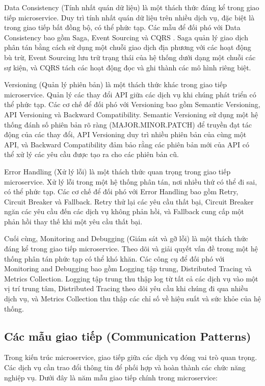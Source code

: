 Data Consistency (Tính nhất quán dữ liệu) là một thách thức đáng kể trong giao
tiếp microservice. Duy trì tính nhất quán dữ liệu trên nhiều dịch vụ, đặc biệt
là trong giao tiếp bất đồng bộ, có thể phức tạp. Các mẫu để đối phó với Data
Consistency bao gồm Saga, Event Sourcing và CQRS \cite{richardson2019}. Saga quản lý giao dịch phân
tán bằng cách sử dụng một chuỗi giao dịch địa phương với các hoạt động bù trừ,
Event Sourcing lưu trữ trạng thái của hệ thống dưới dạng một chuỗi các sự kiện,
và CQRS tách các hoạt động đọc và ghi thành các mô hình riêng biệt.

Versioning (Quản lý phiên bản) là một thách thức khác trong giao tiếp
microservice. Quản lý các thay đổi API giữa các dịch vụ khi chúng phát triển có
thể phức tạp. Các cơ chế để đối phó với Versioning bao gồm Semantic Versioning,
API Versioning và Backward Compatibility. Semantic Versioning sử dụng một hệ
thống đánh số phiên bản rõ ràng (MAJOR.MINOR.PATCH) để truyền đạt tác động của
các thay đổi, API Versioning duy trì nhiều phiên bản của cùng một API, và
Backward Compatibility đảm bảo rằng các phiên bản mới của API có thể xử lý các
yêu cầu được tạo ra cho các phiên bản cũ.

Error Handling (Xử lý lỗi) là một thách thức quan trọng trong giao tiếp
microservice. Xử lý lỗi trong một hệ thống phân tán, nơi nhiều thứ có thể đi
sai, có thể phức tạp. Các cơ chế để đối phó với Error Handling bao gồm Retry,
Circuit Breaker và Fallback. Retry thử lại các yêu cầu thất bại, Circuit
Breaker ngăn các yêu cầu đến các dịch vụ không phản hồi, và Fallback cung cấp
một phản hồi thay thế khi một yêu cầu thất bại.

Cuối cùng, Monitoring and Debugging (Giám sát và gỡ lỗi) là một thách thức đáng
kể trong giao tiếp microservice. Theo dõi và giải quyết vấn đề trong một hệ
thống phân tán phức tạp có thể khó khăn. Các công cụ để đối phó với Monitoring
and Debugging bao gồm Logging tập trung, Distributed Tracing và Metrics
Collection. Logging tập trung thu thập log từ tất cả các dịch vụ vào một vị trí
trung tâm, Distributed Tracing theo dõi yêu cầu khi chúng đi qua nhiều dịch vụ,
và Metrics Collection thu thập các chỉ số về hiệu suất và sức khỏe của hệ
thống.

\subsection{Các mẫu giao tiếp (Communication Patterns)}
Trong kiến trúc microservice, giao tiếp giữa các dịch vụ đóng vai trò quan trọng. Các dịch vụ cần trao đổi thông tin để phối hợp và hoàn thành các chức năng nghiệp vụ. Dưới đây là năm mẫu giao tiếp chính trong microservice:

